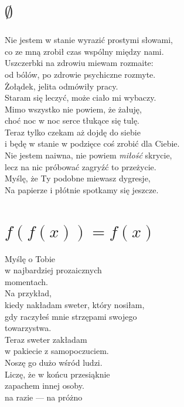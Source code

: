 \documentclass[12pt, a4paper]{memoir}
\renewenvironment{verse}{%
  \par\vspace{\baselineskip}\raggedright
}{
  \par\vspace{\baselineskip}
}
\begin{document}
\section[Zbiór pusty]{$\emptyset$}
\begin{verse}
Nie jestem w stanie wyrazić prostymi słowami,\\
co ze mną zrobił czas wspólny między nami.\\[\baselineskip]

Uszczerbki na zdrowiu miewam rozmaite:\\
od bólów, po zdrowie psychiczne rozmyte.\\[\baselineskip]

Żołądek, jelita odmówiły pracy.\\
Staram się leczyć, może ciało mi wybaczy.\\[\baselineskip]

Mimo wszystko nie powiem, że żałuję,\\
choć noc w noc serce tłukące się tulę.\\[\baselineskip]

Teraz tylko czekam aż dojdę do siebie\\
i będę w stanie w podzięce coś zrobić dla Ciebie.\\[\baselineskip]

Nie jestem naiwna, nie powiem \textit{miłość} skrycie,\\
lecz na nic próbować zagryźć to przeżycie.\\[\baselineskip]

Myślę, że Ty podobne miewasz dygresje,\\
Na papierze i płótnie spotkamy się jeszcze.
\end{verse}

\clearpage

\section[Funkcja idempotentna]{$f(f(x)) = f(x)$}
\begin{verse}
Myślę o Tobie\\
w najbardziej prozaicznych\\
momentach.\\[\baselineskip]

Na przykład,\\
kiedy nakładam sweter, który nosiłam,\\
gdy raczyłeś mnie strzępami swojego\\
towarzystwa.\\[\baselineskip]

Teraz sweter zakładam\\
w pakiecie z samopoczuciem.\\[\baselineskip]

Noszę go dużo wśród ludzi.\\
Liczę, że w końcu przesiąknie\\
zapachem innej osoby.\\[\baselineskip]

na razie --- na próżno
\end{verse}
\end{document}
